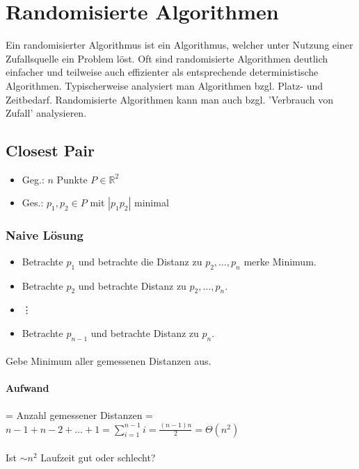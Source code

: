\section{Randomisierte Algorithmen}
Ein randomisierter Algorithmus ist ein Algorithmus, welcher unter Nutzung einer Zufallsquelle ein Problem löst. Oft sind randomisierte Algorithmen deutlich einfacher und teilweise auch effizienter als entsprechende deterministische Algorithmen. Typischerweise analysiert man Algorithmen bzgl. Platz- und Zeitbedarf. Randomisierte Algorithmen kann man auch bzgl. 'Verbrauch von Zufall' analysieren.


\subsection{Closest Pair}
\begin{itemize}
	\item[] Geg.: $n$ Punkte $P \in \mathbb{R}^2$
	\item[]Ges.: $p_1,p_2 \in P$ mit $|p_1 p_2|$ minimal
\end{itemize}


\subsubsection{Naive Lösung}
\begin{itemize}
	\item[] Betrachte $p_1$ und betrachte die Distanz zu $p_2,\dots,p_n$ merke Minimum. %
	\item[] Betrachte $p_2$ und betrachte Distanz zu $p_2,\dots,p_n$.
	\item[] \hspace{1cm}\vdots
	\item[] Betrachte $p_{n-1}$ und betrachte Distanz zu $p_n$.
\end{itemize}

\paragraph*{} Gebe Minimum aller gemessenen Distanzen aus.

\paragraph*{Aufwand} = Anzahl gemessener Distanzen = $n-1 + n-2 + \dots + 1 = \sum\limits_{i=1}^{n-1} i = \frac{(n-1)n}{2} = \Theta(n^2)$
 
\paragraph*{} Ist $\sim n^2$ Laufzeit gut oder schlecht?

